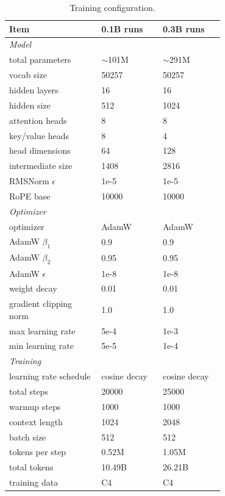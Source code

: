 \documentclass{article}
\theoremstyle{plain}
\theoremstyle{definition}
\theoremstyle{remark}
\begin{document}
\begin{table}[h]
    \centering
    \small
    \caption{Training configuration. }\label{tab:config}
    \begin{tabular}{p{0.3\linewidth}p{0.2\linewidth}p{0.2\linewidth}}
        \toprule
        Item & 0.1B runs & 0.3B runs \\
        \midrule
        \emph{Model} & & \\
        total parameters & $\sim$101M & $\sim$291M \\
        vocab size & 50257 & 50257 \\
        hidden layers & 16 & 16 \\
        hidden size & 512 & 1024 \\
        attention heads & 8 & 8 \\
        key/value heads & 8 & 4 \\
        head dimensions & 64 & 128 \\
        intermediate size & 1408 & 2816 \\
        RMSNorm $\epsilon$ & 1e-5 & 1e-5 \\
        RoPE base & 10000 & 10000 \\
        \midrule
        \emph{Optimizer} & & \\
        optimizer & AdamW & AdamW \\
        AdamW $\beta_1$ & 0.9 & 0.9 \\
        AdamW $\beta_2$ & 0.95 & 0.95 \\
        AdamW $\epsilon$ & 1e-8 & 1e-8 \\
        weight decay & 0.01 & 0.01 \\
        gradient clipping norm & 1.0 & 1.0 \\
        max learning rate & 5e-4 & 1e-3 \\
        min learning rate & 5e-5 & 1e-4 \\
        \midrule
        \emph{Training} & & \\
        learning rate schedule & cosine decay & cosine decay \\
        total steps & 20000 & 25000 \\
        warmup steps & 1000 & 1000 \\
        context length & 1024 & 2048 \\
        batch size & 512 & 512 \\
        tokens per step & 0.52M & 1.05M \\
        total tokens & 10.49B & 26.21B \\
        training data & C4 & C4 \\
        \bottomrule
    \end{tabular}
\end{table}
\end{document}
